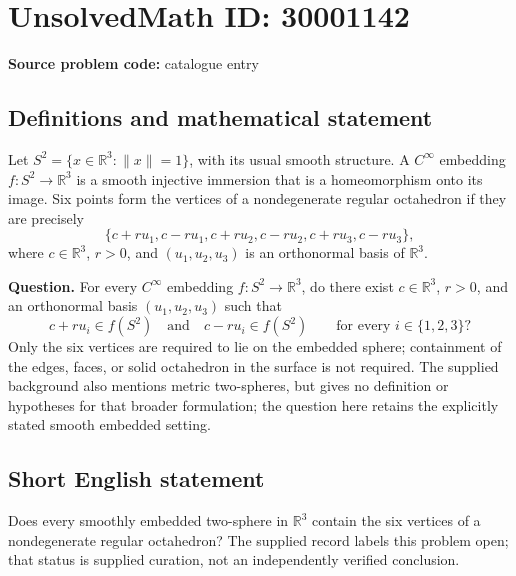 \documentclass[11pt]{article}
\newcommand{\R}{\mathbb{R}}
\begin{document}
\section*{UnsolvedMath ID: 30001142}
\textbf{Source problem code:} catalogue entry
\subsection{Definitions and mathematical statement}
Let \(S^2=\{x\in\R^3:\|x\|=1\}\), with its usual smooth structure. A \(C^\infty\) embedding \(f:S^2\to\R^3\) is a smooth injective immersion that is a homeomorphism onto its image. Six points form the vertices of a nondegenerate regular octahedron if they are precisely
\[
\{c+r u_1,c-r u_1,c+r u_2,c-r u_2,c+r u_3,c-r u_3\},
\]
where \(c\in\R^3\), \(r>0\), and \((u_1,u_2,u_3)\) is an orthonormal basis of \(\R^3\).

\textbf{Question.} For every \(C^\infty\) embedding \(f:S^2\to\R^3\), do there exist \(c\in\R^3\), \(r>0\), and an orthonormal basis \((u_1,u_2,u_3)\) such that
\[
 c+r u_i\in f(S^2)\quad\text{and}\quad c-r u_i\in f(S^2)
 \qquad\text{for every }i\in\{1,2,3\}?
\]
Only the six vertices are required to lie on the embedded sphere; containment of the edges, faces, or solid octahedron in the surface is not required. The supplied background also mentions metric two-spheres, but gives no definition or hypotheses for that broader formulation; the question here retains the explicitly stated smooth embedded setting.
\subsection{Short English statement}
Does every smoothly embedded two-sphere in \(\R^3\) contain the six vertices of a nondegenerate regular octahedron? The supplied record labels this problem open; that status is supplied curation, not an independently verified conclusion.
\end{document}

